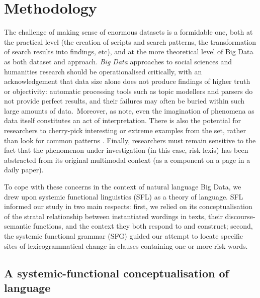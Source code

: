 
\chapter{Methodology}

The challenge of making sense of enormous datasets is a formidable one, both at the practical level (the creation of scripts and search patterns, the transformation of search results into findings, etc), and at the more theoretical level of Big Data as both dataset and approach. \emph{Big Data} approaches to social sciences and humanities research should be operationalised critically, with an acknowledgement that data size alone does not produce findings of higher truth or objectivity: automatic processing tools such as topic modellers and parsers do not provide perfect results, and their failures may often be buried within such large amounts of data.~Moreover, as  note, even the imagination of phenomena as data itself constitutes an act of interpretation. There is also the potential for researchers to cherry-pick interesting or extreme examples from the set, rather than look for common patterns \cite{mautner_time_2005}. Finally, researchers must remain sensitive to the fact that the phenomenon under investigation (in this case, risk lexis) has been abstracted from its original multimodal context (as a component on a page in a daily paper).

To cope with these concerns in the context of natural language Big Data, we drew upon systemic functional linguistics (SFL) as a theory of language. SFL informed our study in two main respects: first, we relied on its conceptualisation of the stratal relationship between instantiated wordings in texts, their discourse-semantic functions, and the context they both respond to and construct; second, the systemic functional grammar (SFG) guided our attempt to locate specific sites of lexicogrammatical change in clauses containing one or more risk words.

\section{A systemic-functional conceptualisation of language}


